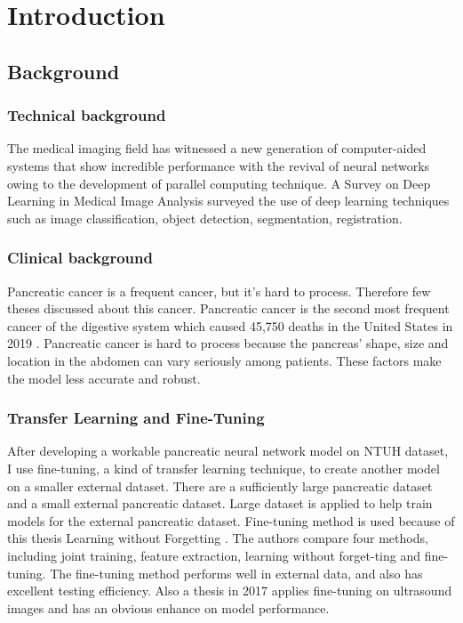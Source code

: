 \chapter{Introduction}
\section{Background}
\subsection{Technical background} 
The medical imaging field has witnessed a new generation of computer-aided systems that show incredible performance with the revival of neural networks owing to the development of parallel computing technique. A Survey on Deep Learning in Medical Image Analysis \cite{litjens2017survey} surveyed the use of deep learning techniques such as image classification, object detection, segmentation, registration.

\subsection{Clinical background}
Pancreatic cancer is a frequent cancer, but it's hard to process. Therefore few theses discussed about this cancer. Pancreatic cancer is the second most frequent cancer of the digestive system which caused 45,750 deaths in the United States in 2019 \cite{siegel2019cancer}. Pancreatic cancer is hard to process because the pancreas’ shape, size and location in the abdomen can vary seriously among patients. These factors make the model less accurate and robust. \cite{Roth2015-mi} 

\subsection{Transfer Learning and Fine-Tuning}
After developing a workable pancreatic neural network model on NTUH dataset, I use fine-tuning, a kind of transfer learning technique, to create another model on a smaller external dataset. There are a sufficiently large pancreatic dataset and a small external pancreatic dataset. Large dataset is applied to help train models for the external pancreatic dataset. Fine-tuning method is used because of this thesis Learning without Forgetting \cite{li2017learning}. The authors compare four methods, including joint training, feature extraction, learning without forget-ting and fine-tuning.  The fine-tuning method performs well in external data, and also has excellent testing efficiency.  Also a thesis in 2017 applies fine-tuning on ultrasound images and has an obvious enhance on model performance. \cite{pan2009survey}

